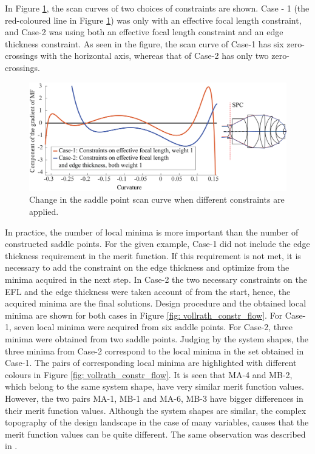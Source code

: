 In Figure \ref{fig: vollrath_consdif}, the scan curves of two choices of constraints are shown. Case - 1 (the red-coloured line in Figure \ref{fig: vollrath_consdif}) was only with an effective focal length constraint, and Case-2 was using both an effective focal length constraint and an edge thickness constraint. As seen in the figure, the scan curve of Case-1 has six zero-crossings with the horizontal axis, whereas that of Case-2 has only two zero-crossings. 
\begin{figure}[h!]
    \centering
    \includegraphics[width=\textwidth]{chapter-4/figures/Vollrath_ConstraintDif.png}
    \caption{Change in the saddle point scan curve when different constraints are applied.}
    \label{fig: vollrath_consdif}
\end{figure}

In practice, the number of local minima is more important than the number of constructed saddle points. For the given example, Case-1 did not include the edge thickness requirement in the merit function. If this requirement is not met, it is necessary to add the constraint on the edge thickness and optimize from the minima acquired in the next step. In Case-2 the two necessary constraints on the EFL and the edge thickness were taken account of from the start, hence, the acquired minima are the final solutions. Design procedure and the obtained local minima are shown for both cases in Figure \ref{fig: vollrath_constr_flow}. For Case-1, seven local minima were acquired from six saddle points. For Case-2, three minima were obtained from two saddle points. Judging by the system shapes, the three minima from Case-2 correspond to the local minima in the set obtained in Case-1. The pairs of corresponding local minima are highlighted with different colours in Figure \ref{fig: vollrath_constr_flow}. It is seen that MA-4 and MB-2, which belong to the same system shape, have very similar merit function values. However, the two pairs MA-1, MB-1 and MA-6, MB-3 have bigger differences in their merit function values. 
Although the system shapes are similar, the complex topography of the design landscape in the case of many variables, causes that the merit function values can be quite different. The same observation was described in \cite{PascalTriplet2009}. 



